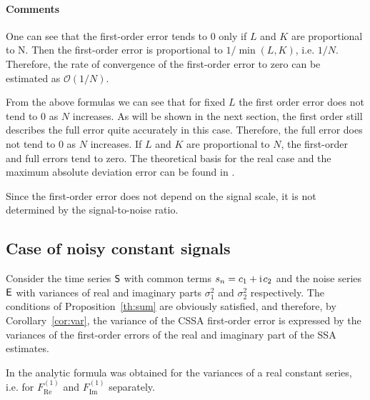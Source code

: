 \documentclass[engproc, submit, article,pdftex,moreauthors]{Definitions/mdpi}
\newcommand{\iu}{\mathrm{i}\mkern2mu}
\renewcommand{\Re}{\operatorname{Re}}
\renewcommand{\Im}{\operatorname{Im}}
\begin{document}
\paragraph{Comments}
One can see that the first-order error tends to $0$ only if $L$ and $K$ are proportional to N. Then the first-order error is proportional to $1/\min(L,K)$, i.e. $1/N$. Therefore, the rate of convergence of the first-order error to zero can be estimated as $\mathcal{O}(1/N)$.

\begin{Remark}
From the above formulas we can see that for fixed $L$ the first order error does not tend to $0$ as $N$ increases. As will be shown in the next section, the first order still describes the full error quite accurately in this case. Therefore, the full error does not tend to $0$ as $N$ increases. If $L$ and $K$ are proportional to $N$, the first-order and full errors tend to zero.
The theoretical basis for the real case and the maximum absolute deviation error can be found in \cite{Nekrutkin2024}.
\end{Remark}

Since the first-order error does not depend on the signal scale, it is not determined by the signal-to-noise ratio.

\subsection{Case of noisy constant signals}
\label{sec:noise}

Consider the time series $\textsf{S}$ with common terms $s_n = c_1 + \iu c_2$ and the noise series $\textsf{E}$ with variances of real and imaginary parts $\sigma_1^2$ and $\sigma_2^2$ respectively.
The conditions of Proposition~\ref{th:sum} are obviously satisfied, and therefore, by Corollary~\ref{cor:var}, the variance of the CSSA first-order error is expressed by the variances of the first-order errors of the real and imaginary part of the SSA estimates.

In \cite{Golyandina.Vlassieva2009} the analytic formula was obtained for the variances of a real constant series, i.e. for $F^{(1)}_{\Re}$ and $F^{(1)}_{\Im}$ separately.
\end{document}
